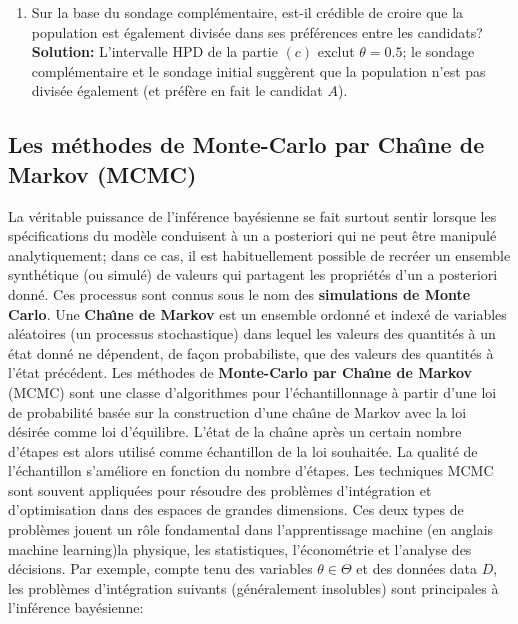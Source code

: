 \begin{Exemple}
\begin{enumerate}[noitemsep,label=(\alph*)]
 \item Sur la base du sondage compl\'ementaire, est-il cr\'edible de croire que la population est \'egalement divis\'ee dans ses pr\'ef\'erences entre les candidats? \newl\textbf{Solution:} L'intervalle HPD de la partie $(c)$ exclut $\theta=0.5$; le sondage compl\'ementaire et le sondage initial sugg\`erent que la population n'est pas divis\'ee \'egalement (et pr\'ef\`ere en fait le candidat $A$).
\end{enumerate}
\end{Exemple}

\subsection{Les m\'ethodes de Monte-Carlo par Cha\^{\i}ne de Markov (MCMC)}
La v\'eritable puissance de l'inf\'erence bay\'esienne se fait surtout sentir lorsque les sp\'ecifications du mod\`ele conduisent \`a un a posteriori qui ne peut être manipul\'e analytiquement; dans ce cas, il est habituellement possible de recr\'eer un ensemble synth\'etique (ou simul\'e) de valeurs qui partagent les propri\'et\'es d'un a posteriori donn\'e. Ces processus sont connus sous le nom des \textbf{simulations de Monte Carlo}.  Une \textbf{Cha\^{\i}ne de Markov} est un ensemble ordonn\'e et index\'e de variables al\'eatoires (un processus stochastique) dans lequel les valeurs des quantit\'es \`a un \'etat donn\'e ne d\'ependent, de façon probabiliste, que des valeurs des quantit\'es \`a l'\'etat pr\'ec\'edent.  Les m\'ethodes de \textbf{Monte-Carlo par Cha\^{\i}ne de Markov} (MCMC) sont une classe d'algorithmes pour l'\'echantillonnage \`a partir d'une loi de probabilit\'e bas\'ee sur la construction d'une cha\^{\i}ne de Markov avec la loi d\'esir\'ee comme loi d'\'equilibre. L'\'etat de la cha\^{\i}ne apr\`es un certain nombre d'\'etapes est alors utilis\'e comme \'echantillon de la loi souhait\'ee. La qualit\'e de l'\'echantillon s'am\'eliore en fonction du nombre d'\'etapes. \newl Les techniques MCMC sont souvent appliqu\'ees pour r\'esoudre des probl\`emes d'int\'egration et d'optimisation dans des espaces de grandes dimensions. Ces deux types de probl\`emes jouent un rôle fondamental dans l'apprentissage machine (en anglais machine learning)la physique, les statistiques, l'\'econom\'etrie et l'analyse des d\'ecisions. Par exemple, compte tenu des variables $\theta\in\Theta$ et des donn\'ees data $D$, les probl\`emes d'int\'egration suivants (g\'en\'eralement insolubles) sont principales \`a l'inf\'erence bay\'esienne:
